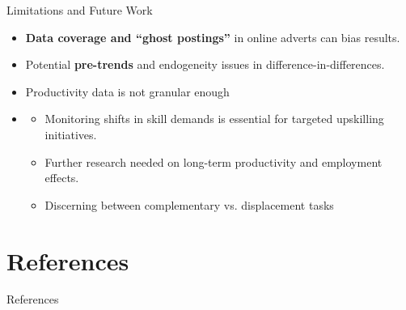 \documentclass{beamer}
\begin{document}
\begin{frame}{Limitations and Future Work}
    \begin{itemize}
        \item \textbf{Data coverage and “ghost postings”} in online adverts can bias results.
        \item Potential \textbf{pre-trends} and endogeneity issues in difference-in-differences.
        \item Productivity data is not granular enough
        \vspace{0.5cm}
        \item {} 
        \begin{itemize}
            \item Monitoring shifts in skill demands is essential for targeted upskilling initiatives.
            \item Further research needed on long-term productivity and employment effects.
            \item Discerning between complementary vs. displacement tasks
        \end{itemize}
    \end{itemize}
\end{frame}

\section{References}
\begin{frame}[allowframebreaks]{References}
\tiny


\end{frame}
\end{document}
